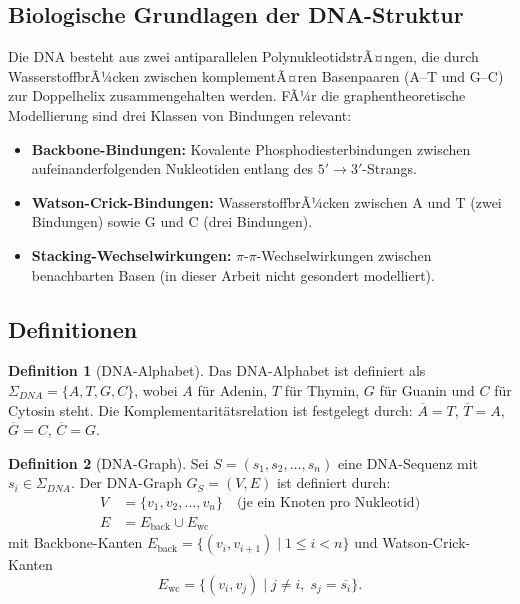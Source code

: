 ﻿\documentclass[a4paper,12pt]{article}
\theoremstyle{definition}
\newtheorem{definition}{Definition}
\begin{document}
\subsection{Biologische Grundlagen der DNA-Struktur}

Die DNA besteht aus zwei antiparallelen PolynukleotidstrÃ¤ngen, die durch
WasserstoffbrÃ¼cken zwischen komplementÃ¤ren Basenpaaren (A--T und G--C) zur
Doppelhelix zusammengehalten werden. FÃ¼r die graphentheoretische Modellierung
sind drei Klassen von Bindungen relevant:

\begin{itemize}
    \item \textbf{Backbone-Bindungen:} Kovalente Phosphodiesterbindungen zwischen
          aufeinanderfolgenden Nukleotiden entlang des $5' \to 3'$-Strangs.
    \item \textbf{Watson-Crick-Bindungen:} WasserstoffbrÃ¼cken zwischen A und T
          (zwei Bindungen) sowie G und C (drei Bindungen).
    \item \textbf{Stacking-Wechselwirkungen:} $\pi$-$\pi$-Wechselwirkungen zwischen
          benachbarten Basen (in dieser Arbeit nicht gesondert modelliert).
\end{itemize}

\subsection{Definitionen}

\begin{definition}[DNA-Alphabet]
    Das DNA-Alphabet ist definiert als $\Sigma_{DNA} = \{A, T, G, C\}$, wobei
    $A$ f\"{u}r Adenin, $T$ f\"{u}r Thymin, $G$ f\"{u}r Guanin und $C$ f\"{u}r
    Cytosin steht. Die Komplementarit\"{a}tsrelation ist festgelegt durch:
    $\overline{A} = T$, $\overline{T} = A$, $\overline{G} = C$, $\overline{C} = G$.
\end{definition}

\begin{definition}[DNA-Graph]
    Sei $S = (s_1, s_2, \ldots, s_n)$ eine DNA-Sequenz mit $s_i \in \Sigma_{DNA}$.
    Der DNA-Graph $G_S = (V, E)$ ist definiert durch:
    \begin{align*}
        V &= \{v_1, v_2, \ldots, v_n\} \quad \text{(je ein Knoten pro Nukleotid)} \\
        E &= E_{\text{back}} \cup E_{\text{wc}}
    \end{align*}
    mit Backbone-Kanten $E_{\text{back}} = \{(v_i, v_{i+1}) \mid 1 \leq i < n\}$
    und Watson-Crick-Kanten
    \[
        E_{\text{wc}} = \{(v_i, v_j) \mid j \neq i,\; s_j = \overline{s_i}\}.
    \]
\end{definition}
\end{document}
